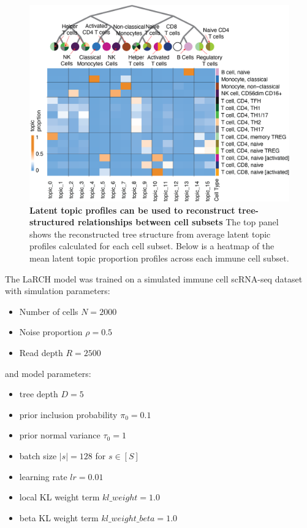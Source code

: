 \begin{figure}
    \centering
    \includegraphics[width=\textwidth]{Figures/hier_hm.png}
    \caption{\textbf{Latent topic profiles can be used to reconstruct tree-structured relationships between cell subsets} The top panel shows the reconstructed tree structure from average latent topic profiles calculated for each cell subset. Below is a heatmap of the mean latent topic proportion profiles across each immune cell subset.}
    \label{fig:hier_hm}
\end{figure}

The LaRCH model was trained on a simulated immune cell scRNA-seq dataset with simulation parameters:
\begin{itemize}
    \item Number of cells $N = 2000$
    \item Noise proportion $\rho = 0.5$
    \item Read depth $R = 2500$
\end{itemize} 
and model parameters:
\begin{itemize}
    \item tree depth $D = 5$
    \item prior inclusion probability $\pi_0 = 0.1$
    \item prior normal variance $\tau_0 = 1$
    \item batch size $|s| = 128$ for $s \in [S]$
    \item learning rate $lr = 0.01$
    \item local KL weight term $kl\_weight = 1.0$
    \item beta KL weight term $kl\_weight\_beta = 1.0$
\end{itemize}

